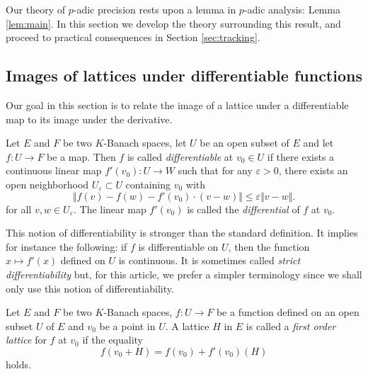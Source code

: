 \documentclass{lms}
\begin{document}
Our theory of $p$-adic precision rests upon a lemma in $p$-adic 
analysis: Lemma \ref{lem:main}.  In this section we develop the theory 
surrounding this result, and proceed to practical consequences in 
Section \ref{sec:tracking}.

\subsection{Images of lattices under differentiable functions}

Our goal in this section is to relate the image of a lattice under a 
differentiable map to its image under the derivative.

\begin{deftn} \label{deftn : diff}
Let $E$ and $F$ be two $K$-Banach spaces, let $U$ be an open 
subset of $E$ and let $f : U \rightarrow F$ be a map. Then $f$ is called 
\emph{differentiable} at $v_0 \in U$ if there exists a continuous linear 
map $f'(v_0) : U \rightarrow W$ such that for any $\varepsilon >0$, 
there exists an open neighborhood $U_\varepsilon \subset U$ containing 
$v_0$ with
\[ 
\Vert f(v)-f(w)-f'(v_0) \cdot \left( v-w \right) \Vert 
\leq \varepsilon \Vert v-w \Vert. 
\]
for all $v, w \in U_\varepsilon$.  The linear map $f'(v_0)$ is called the \emph{differential} of $f$ at $v_0$.
\end{deftn}

\begin{rem}
\label{rem:differentiability}
This notion of differentiability is stronger than the standard definition.
It implies for instance the following: if $f$ is 
differentiable on $U$, then the function $x \mapsto f'(x)$ defined on 
$U$ is continuous. 
It is sometimes called \emph{strict differentiability} but, for this
article, we prefer a simpler terminology since we shall only use this
notion of differentiability.
\end{rem}


\begin{deftn}
\label{def:firstorder}
Let $E$ and $F$ be two $K$-Banach spaces, $f : U \rightarrow F$ be a 
function defined on an open subset $U$ of $E$ and $v_0$ be a 
point in $U$.
A lattice $H$ in $E$ is called a \emph{first order lattice} for $f$ at 
$v_0$ if the equality
\begin{equation}
\label{eq:firstorder}
f(v_0 + H) = f(v_0) + f'(v_0) (H)
\end{equation}
holds.
\end{deftn}
\end{document}
